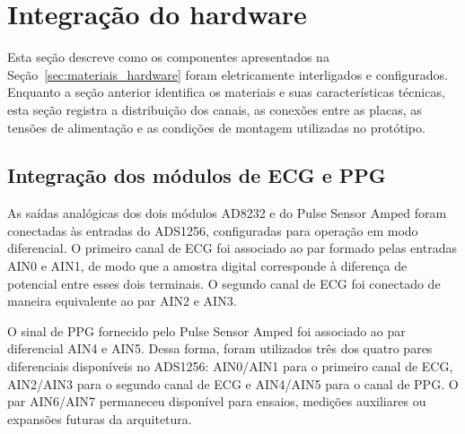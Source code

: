 \documentclass[a4paper,12pt]{fcte}
\begin{document}
\section{Integração do hardware}
\label{sec:integracao_hardware}

Esta seção descreve como os componentes apresentados na Seção~\ref{sec:materiais_hardware} foram eletricamente interligados e configurados. Enquanto a seção anterior identifica os materiais e suas características técnicas, esta seção registra a distribuição dos canais, as conexões entre as placas, as tensões de alimentação e as condições de montagem utilizadas no protótipo.

\subsection{Integração dos módulos de ECG e PPG}
\label{subsec:integracao_modulos}

As saídas analógicas dos dois módulos AD8232 e do Pulse Sensor Amped foram conectadas às entradas do ADS1256, configuradas para operação em modo diferencial. O primeiro canal de ECG foi associado ao par formado pelas entradas AIN0 e AIN1, de modo que a amostra digital corresponde à diferença de potencial entre esses dois terminais. O segundo canal de ECG foi conectado de maneira equivalente ao par AIN2 e AIN3.

O sinal de PPG fornecido pelo Pulse Sensor Amped foi associado ao par diferencial AIN4 e AIN5. Dessa forma, foram utilizados três dos quatro pares diferenciais disponíveis no ADS1256: AIN0/AIN1 para o primeiro canal de ECG, AIN2/AIN3 para o segundo canal de ECG e AIN4/AIN5 para o canal de PPG. O par AIN6/AIN7 permaneceu disponível para ensaios, medições auxiliares ou expansões futuras da arquitetura.


\end{document}
